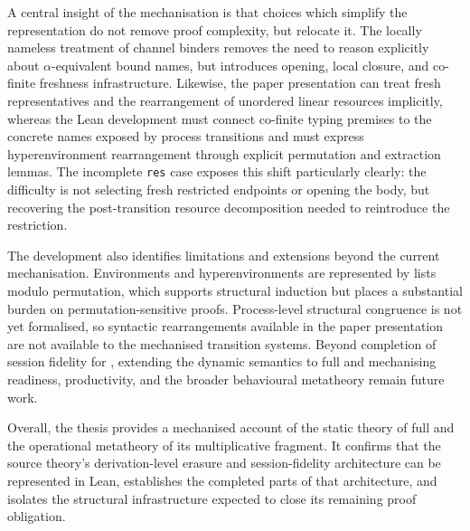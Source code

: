 A central insight of the mechanisation is that choices which simplify the representation do not remove proof complexity, but relocate it. The locally nameless treatment of channel binders removes the need to reason explicitly about $\alpha$-equivalent bound names, but introduces opening, local closure, and co-finite freshness infrastructure. Likewise, the paper presentation can treat fresh representatives and the rearrangement of unordered linear resources implicitly, whereas the Lean development must connect co-finite typing premises to the concrete names exposed by process transitions and must express hyperenvironment rearrangement through explicit permutation and extraction lemmas. The incomplete \texttt{res} case exposes this shift particularly clearly: the difficulty is not selecting fresh restricted endpoints or opening the body, but recovering the post-transition resource decomposition needed to reintroduce the restriction.

The development also identifies limitations and extensions beyond the current mechanisation. Environments and hyperenvironments are represented by lists modulo permutation, which supports structural induction but places a substantial burden on permutation-sensitive proofs. Process-level structural congruence is not yet formalised, so syntactic rearrangements available in the paper presentation are not available to the mechanised transition systems. Beyond completion of session fidelity for \pimll{}, extending the dynamic semantics to full \pill{} and mechanising readiness, productivity, and the broader behavioural metatheory remain future work.

Overall, the thesis provides a mechanised account of the static theory of full \pill{} and the operational metatheory of its multiplicative fragment. It confirms that the source theory's derivation-level erasure and session-fidelity architecture can be represented in Lean, establishes the completed parts of that architecture, and isolates the structural infrastructure expected to close its remaining proof obligation.
